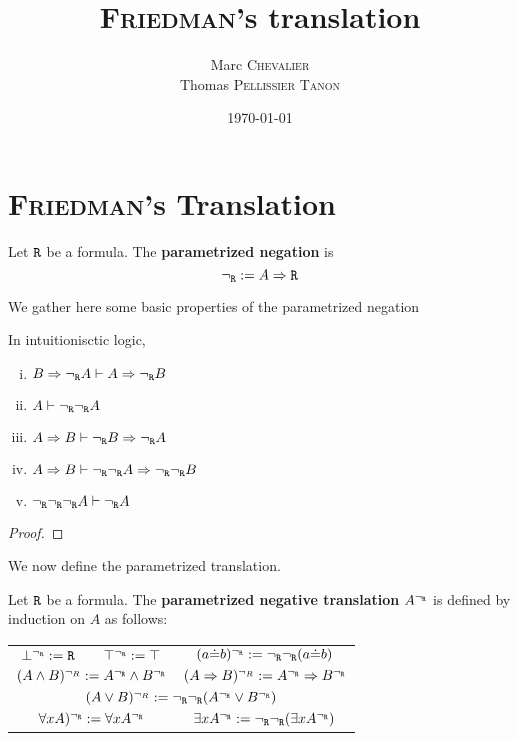 

\author{
    Marc \textsc{Chevalier}\\
    Thomas \textsc{Pellissier} \textsc{Tanon}}
\date{\today}
\title{\textsc{Friedman}'s translation}



\maketitle

\section{\textsc{Friedman}'s Translation}

\begin{definition}
    Let $\texttt{R}$ be a formula. The \textbf{parametrized negation} is 
    $$
        {\neg_{\texttt{R}}} := A \Rightarrow \texttt{R}
    $$
\end{definition}

We gather here some basic properties of the parametrized negation

\begin{proposition}
    In intuitionisctic logic,
    \begin{enumerate}[(i)]
        \item $B \Rightarrow {\neg_{\texttt{R}}} A \vdash A \Rightarrow {\neg_{\texttt{R}}} B$
        \item $A\vdash {\neg_{\texttt{R}}}{\neg_{\texttt{R}}} A$
        \item $A\Rightarrow B \vdash {\neg_{\texttt{R}}} B \Rightarrow {\neg_{\texttt{R}}} A$
        \item $A\Rightarrow B \vdash {\neg_{\texttt{R}}}{\neg_{\texttt{R}}} A \Rightarrow {\neg_{\texttt{R}}} {\neg_{\texttt{R}}} B$
        \item ${\neg_{\texttt{R}}} {\neg_{\texttt{R}}} {\neg_{\texttt{R}}} A \vdash {\neg_{\texttt{R}}} A$
    \end{enumerate}
\end{proposition}
\begin{proof}
    
\end{proof}

We now define the parametrized translation.
\begin{definition}
    Let $\texttt{R}$ be a formula. The \textbf{parametrized negative translation} $A^{\neg_{\texttt{R}}}$ is defined by induction on $A$ as follows:
    \begin{center}
    \begin{tabular}{cccc}
        $\bot^{\neg_{\texttt{R}}} := \texttt{R}$ & $\top^{\neg_{\texttt{R}}} := \top$ & \multicolumn{2}{c}{$(a\dot{=}b)^{\neg_{\texttt{R}}} := {\neg_{\texttt{R}}}{\neg_{\texttt{R}}}(a\dot{=}b)$}\\
        \multicolumn{2}{c}{$(A\wedge B)^{\neg_R}:=A^{\neg_{\texttt{R}}} \wedge B^{\neg_{\texttt{R}}}$} & \multicolumn{2}{c}{$(A \Rightarrow B)^{\neg_R}:=A^{\neg_{\texttt{R}}} \Rightarrow B^{\neg_{\texttt{R}}}$}\\
        \multicolumn{4}{c}{$(A \vee B)^{\neg_R}:={\neg_{\texttt{R}}}{\neg_{\texttt{R}}}(A^{\neg_{\texttt{R}}} \vee B^{\neg_{\texttt{R}}})$}\\
        \multicolumn{2}{c}{$\forall x A)^{\neg_{\texttt{R}}} := \forall x A^{\neg_{\texttt{R}}}$} & \multicolumn{2}{c}{$\exists x A^{\neg_{\texttt{R}}} := {\neg_{\texttt{R}}}{\neg_{\texttt{R}}}(\exists x A^{\neg_{\texttt{R}}})$}
    \end{tabular}
    \end{center}
\end{definition}

